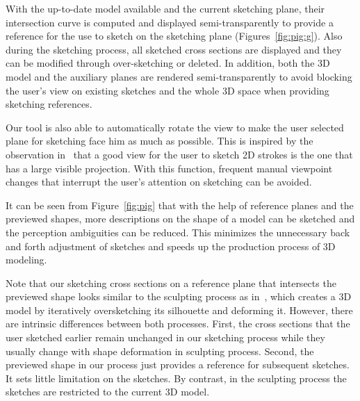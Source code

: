 With the up-to-date model available and the current sketching plane,
their intersection curve is computed and displayed
semi-transparently to provide a reference for the use to sketch on
the sketching plane (Figures~\ref{fig:pig:g}). Also during the
sketching process, all sketched cross sections  are displayed and
they can be modified through over-sketching or deleted. In addition,
both the 3D model and the auxiliary planes are rendered
semi-transparently to avoid blocking the user's view on existing
sketches and the whole 3D space when providing sketching references.

Our tool is also able to automatically rotate the view to make the
user selected plane for sketching face him as much as possible. This
is inspired by the observation in~\cite{BBS08} that a good view for
the user to sketch 2D strokes is the one that has a large visible
projection. With this function, frequent manual viewpoint changes
that interrupt the user's attention on sketching can be avoided.

It can be seen from Figure~\ref{fig:pig} that with the help of
reference planes and the previewed shapes, more descriptions on the
shape of a model can be sketched and the perception ambiguities can
be reduced. This minimizes the unnecessary back and forth adjustment
of sketches and speeds up the production process of 3D modeling.

Note that our sketching cross sections on a reference plane that
intersects the previewed shape looks similar to the sculpting
process as in~\cite{NSAC05,KSV09}, which creates a 3D model by
iteratively oversketching its silhouette and deforming it. However,
there are intrinsic differences between both processes. First, the
cross sections that the user sketched earlier remain unchanged in
our sketching process while they usually change with shape
deformation in sculpting process. Second, the previewed shape in our
process just provides a reference for subsequent sketches. It sets
little limitation on the sketches. By contrast, in the sculpting
process the sketches are restricted to the current 3D model.



